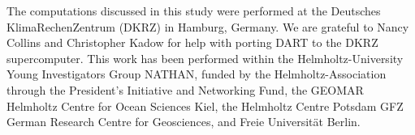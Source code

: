 The computations discussed in this study were performed at the Deutsches KlimaRechenZentrum (DKRZ) in Hamburg, Germany.
We are grateful to 
Nancy Collins and Christopher Kadow for help with porting DART to the DKRZ supercomputer.
This work has been performed within the Helmholtz-University Young Investigators Group NATHAN, funded by the Helmholtz-Association through the President's Initiative and Networking Fund, the GEOMAR Helmholtz Centre for Ocean Sciences Kiel, the Helmholtz Centre Potsdam GFZ German Research Centre for Geosciences, and Freie Universit\"at Berlin.

